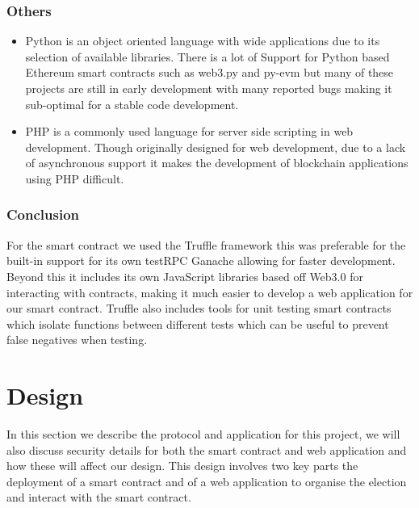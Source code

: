\documentclass{entcs}
\begin{document}
\subsubsection{Others}
\begin{itemize}
    \item Python is an object oriented language with wide applications due to its selection of available libraries. There is a lot of Support for Python based Ethereum smart contracts such as web3.py and py-evm but many of these projects are still in early development with many reported bugs making it sub-optimal for a stable code development.
    \item PHP is a commonly used language for server side scripting in web development. Though originally designed for web development, due to a lack of asynchronous support it makes the development of blockchain applications using PHP difficult.
\end{itemize}

\subsubsection{Conclusion}
For the smart contract we used the Truffle framework this was preferable for the built-in support for its own testRPC Ganache allowing for faster development. Beyond this it includes its own JavaScript libraries based off Web3.0 for interacting with contracts, making it much easier to develop a web application for our smart contract. Truffle also includes tools for unit testing smart contracts which isolate functions between different tests which can be useful to prevent false negatives when testing.


\section{Design} \label{sec: Design}
In this section we describe the protocol and application for this project, we will also discuss security details for both the smart contract and web application and how these will affect our design. This design involves two key parts the deployment of a smart contract and of a web application to organise the election and interact with the smart contract.
\end{document}
